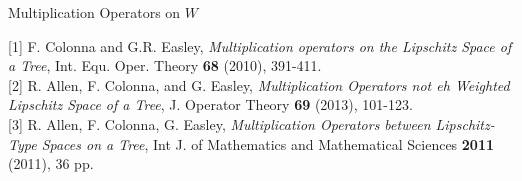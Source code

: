 \documentclass[11 pt]{report}
\begin{document}
\indent Multiplication Operators on $W$\\





\appendix
\appendixeqnumbering








[1] F. Colonna and G.R. Easley, \textit{Multiplication operators on the Lipschitz Space of a Tree}, Int. Equ. Oper. Theory \textbf{68} (2010), 391-411.\\

[2] R. Allen, F. Colonna, and G. Easley, \textit{Multiplication Operators not eh Weighted Lipschitz Space of a Tree}, J. Operator Theory \textbf{69} (2013), 101-123.\\

[3] R. Allen, F. Colonna, G. Easley, \textit{Multiplication Operators between Lipschitz-Type Spaces on a Tree}, Int J. of Mathematics and Mathematical Sciences \textbf{2011} (2011), 36 pp.\\


\end{document}

